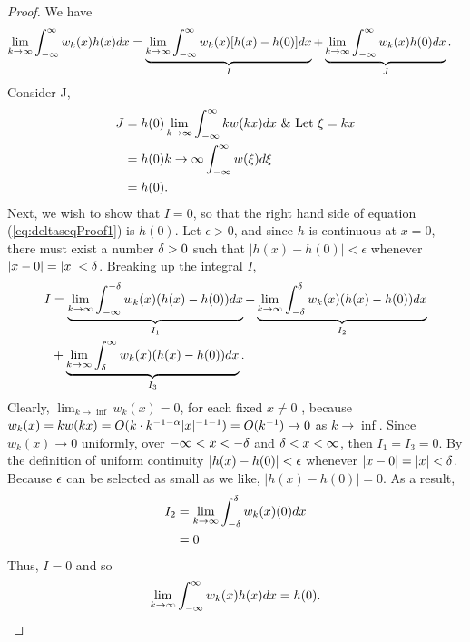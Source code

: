 \begin{proof}    
    We have
    \begin{equation}\label{eq:deltaseqProof1}
        \begin{split}
            \lim_{k\rightarrow \infty}\int_{-\infty}^{\infty} w_k(x)h(x) dx &= \underbrace{\lim_{k\rightarrow\infty} \int_{-\infty}^{\infty} w_k(x)[h(x)-h(0)]dx}_I+ \underbrace{\lim_{k\rightarrow\infty} \int_{-\infty}^{\infty} w_k(x)h(0)dx}_J.
        \end{split}
    \end{equation}
    Consider J,
    \begin{equation}
        \begin{split}
            J &= h(0) \lim_{k\rightarrow\inf} \intR kw(kx)dx\ \&\ \text{Let  }\xi =kx\\
            &=h(0){k\rightarrow \inf} \intR w(\xi) d\xi\\
            &= h(0).
        \end{split}
    \end{equation}
    Next, we wish to show that \(I=0\), so that the right hand side of equation (\ref{eq:deltaseqProof1}) is \(h(0)\). Let \(\epsilon > 0\), and since \(h\) is continuous at \(x=0\), there must exist a number \(\delta>0\) such that \(|h(x)-h(0)|<\epsilon\) whenever \(|x-0|=|x|<\delta\). Breaking up the integral \(I\),
    \begin{equation}
        \begin{split}
            I &= \underbrace{\lim_{k\rightarrow \infty} \int_{-\infty}^{-\delta} w_k(x)(h(x)-h(0)) dx}_{I_1} + \underbrace{\lim_{k\rightarrow \infty} \int_{-\delta}^{\delta} w_k(x)(h(x)-h(0)) dx}_{I_2} \\ & + \underbrace{\lim_{k\rightarrow \infty} \int_{\delta}^{\infty} w_k(x)(h(x)-h(0)) dx}_{I_3}.\\
        \end{split}
    \end{equation}
    Clearly, \( \lim_{k\rightarrow \inf} w_k(x)=0\), for each fixed \(x \neq 0\) , because \(w_k(x)=kw(kx)=O(k\cdot k^{-1-\alpha} |x|^{-1-1}) = O(k^{-1}) \rightarrow 0\) as \(k \rightarrow \inf\). 
    Since \(w_k(x)\rightarrow 0\) uniformly, over \(-\infty< x < -\delta\) and \(\delta < x < \infty \), then \(I_1=I_3 =0\). By the definition of uniform continuity \(|h(x)-h(0)|<\epsilon\) whenever \(|x-0|=|x|<\delta\). Because \(\epsilon\) can be selected as small as we like, \(|h(x)-h(0)|=0\). As a result,
    \begin{equation*}
        \begin{split}
            I_2 &= \lim_{k\rightarrow \infty} \int_{-\delta}^{\delta} w_k(x)(0) dx\\
            &=0
        \end{split}
    \end{equation*}
    Thus, \(I=0\) and so 
    \begin{equation}
        \lim_{k\rightarrow \infty}\int_{-\infty}^{\infty} w_k(x)h(x) dx = h(0).
    \end{equation}


\end{proof}

